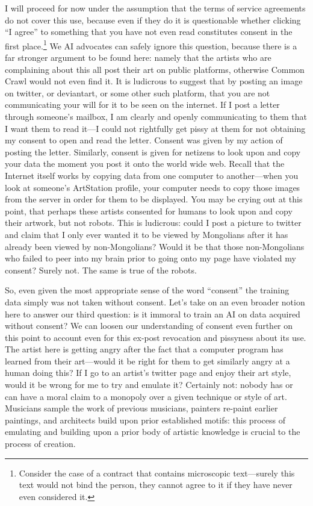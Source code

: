 \documentclass[11pt]{article}
\begin{document}
I will proceed for now under the assumption that the terms of service agreements do not cover this use, because even if they do it is questionable whether clicking ``I agree'' to something that you have not even read constitutes consent in the first place.\footnote{Consider the case of a contract that contains microscopic text---surely this text would not bind the person, they cannot agree to it if they have never even considered it.} We AI advocates can safely ignore this question, because there is a far stronger argument to be found here: namely that the artists who are complaining about this all post their art on public platforms, otherwise Common Crawl would not even find it. It is ludicrous to suggest that by posting an image on twitter, or deviantart, or some other such platform, that you are not communicating your will for it to be seen on the internet. If I post a letter through someone's mailbox, I am clearly and openly communicating to them that I want them to read it---I could not rightfully get pissy at them for not obtaining my consent to open and read the letter. Consent was given by my action of posting the letter. Similarly, consent is given for netizens to look upon and copy your data the moment you post it onto the world wide web. Recall that the Internet itself works by copying data from one computer to another---when you look at someone's ArtStation profile, your computer needs to copy those images from the server in order for them to be displayed. You may be crying out at this point, that perhaps these artists consented for humans to look upon and copy their artwork, but not robots. This is ludicrous: could I post a picture to twitter and claim that I only ever wanted it to be viewed by Mongolians after it has already been viewed by non-Mongolians? Would it be that those non-Mongolians who failed to peer into my brain prior to going onto my page have violated my consent? Surely not. The same is true of the robots.

So, even given the most appropriate sense of the word ``consent'' the training data simply was not taken without consent. Let's take on an even broader notion here to answer our third question: is it immoral to train an AI on data acquired without consent? We can loosen our understanding of consent even further on this point to account even for this ex-post revocation and pissyness about its use. The artist here is getting angry after the fact that a computer program has learned from their art---would it be right for them to get similarly angry at a human doing this? If I go to an artist's twitter page and enjoy their art style, would it be wrong for me to try and emulate it? Certainly not: nobody has or can have a moral claim to a monopoly over a given technique or style of art. Musicians sample the work of previous musicians, painters re-paint earlier paintings, and architects build upon prior established motifs: this process of emulating and building upon a prior body of artistic knowledge is crucial to the process of creation.
\end{document}
